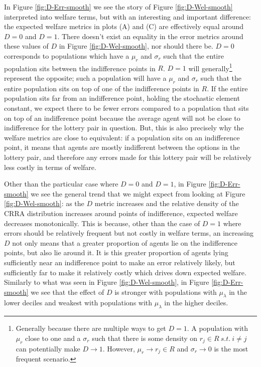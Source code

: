 \documentclass[../main.tex]{subfiles}
\begin{document}
In Figure \ref{fig:D-Err-smooth} we see the story of Figure \ref{fig:D-Wel-smooth} interpreted into welfare terms, but with an interesting and important difference: the expected welfare metrics in plots (A) and (C) are effectively equal around $D=0$ and $D=1$.
There doesn't exist an equality in the error metrics around these values of $D$ in Figure \ref{fig:D-Wel-smooth}, nor should there be.
$D=0$ corresponds to populations which have a $\mu_r$ and $\sigma_r$ such that the entire population sits between the indifference points in $R$.
$D=1$ will generally\footnote{
	Generally because there are multiple ways to get $D=1$. A population with $\mu_r$ close to one and a $\sigma_r$ such that there is some density on $r_j \in R \ \mathit{s.t.} \ i \neq j$ can potentially make $D \to 1$.
	However, $\mu_r \to r_j \in R$ and $\sigma_r \to 0$ is the most frequent scenario.
} represent the opposite; such a population will have a $\mu_r$ and $\sigma_r$ such that the entire population sits on top of one of the indifference points in $R$.
If the entire population sits far from an indifference point, holding the stochastic element constant, we expect there to be fewer errors compared to a population that sits on top of an indifference point because the average agent will not be close to indifference for the lottery pair in question.
But, this is also precisely why the welfare metrics are close to equivalent: if a population sits on an indifference point, it means that agents are mostly indifferent between the options in the lottery pair, and therefore any errors made for this lottery pair will be relatively less costly in terms of welfare.

Other than the particular case where $D=0$ and $D=1$, in Figure \ref{fig:D-Err-smooth} we see the general trend that we might expect from looking at Figure \ref{fig:D-Wel-smooth}: as the $D$ metric increases and the relative density of the CRRA distribution increases around points of indifference, expected welfare decreases monotonically.
This is because, other than the case of $D=1$ where errors should be relatively frequent but not costly in welfare terms, an increasing $D$ not only means that a greater proportion of agents lie on the indifference points, but also lie around it.
It is this greater proportion of agents lying sufficiently near an indifference point to make an error relatively likely, but sufficiently far to make it relatively costly which drives down expected welfare.
Similarly to what was seen in Figure \ref{fig:D-Wel-smooth}, in Figure \ref{fig:D-Err-smooth} we see that the effect of $D$ is stronger with populations with $\mu_\lambda$ in the lower deciles and weakest with populations with $\mu_\lambda$ in the higher deciles.
\end{document}
